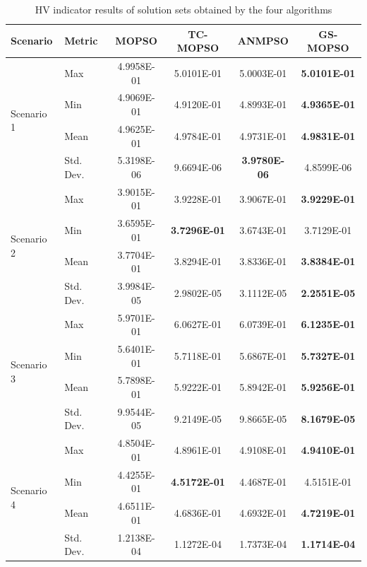 \documentclass[lettersize,journal]{IEEEtran}
\begin{document}
\begin{table}[htbp]
  \centering
  \caption{HV indicator results of solution sets obtained by the four algorithms}
  \label{tab:HV_index_results}
  \small 
  \begin{tabular}{llcccc}
    \toprule
    \textbf{Scenario} & \textbf{Metric} & \textbf{MOPSO} & \textbf{TC-MOPSO} & \textbf{ANMPSO} & \textbf{GS-MOPSO} \\
    \midrule
    \multirow{4}{*}{Scenario 1} 
    & Max & 4.9958E-01 & 5.0101E-01 & 5.0003E-01 & \textbf{5.0101E-01} \\
    & Min & 4.9069E-01 & 4.9120E-01 & 4.8993E-01 & \textbf{4.9365E-01} \\
    & Mean & 4.9625E-01 & 4.9784E-01 & 4.9731E-01 & \textbf{4.9831E-01} \\
    & Std. Dev. & 5.3198E-06 & 9.6694E-06 & \textbf{3.9780E-06} & 4.8599E-06 \\
    \midrule
    \multirow{4}{*}{Scenario 2} 
    & Max & 3.9015E-01 & 3.9228E-01 & 3.9067E-01 & \textbf{3.9229E-01} \\
    & Min & 3.6595E-01 & \textbf{3.7296E-01} & 3.6743E-01 & 3.7129E-01 \\
    & Mean & 3.7704E-01 & 3.8294E-01 & 3.8336E-01 & \textbf{3.8384E-01} \\
    & Std. Dev. & 3.9984E-05 & 2.9802E-05 & 3.1112E-05 & \textbf{2.2551E-05} \\
    \midrule
    \multirow{4}{*}{Scenario 3} 
    & Max & 5.9701E-01 & 6.0627E-01 & 6.0739E-01 & \textbf{6.1235E-01} \\
    & Min & 5.6401E-01 & 5.7118E-01 & 5.6867E-01 & \textbf{5.7327E-01} \\
    & Mean & 5.7898E-01 & 5.9222E-01 & 5.8942E-01 & \textbf{5.9256E-01} \\
    & Std. Dev. & 9.9544E-05 & 9.2149E-05 & 9.8665E-05 & \textbf{8.1679E-05} \\
    \midrule
    \multirow{4}{*}{Scenario 4} 
    & Max & 4.8504E-01 & 4.8961E-01 & 4.9108E-01 & \textbf{4.9410E-01} \\
    & Min & 4.4255E-01 & \textbf{4.5172E-01} & 4.4687E-01 & 4.5151E-01 \\
    & Mean & 4.6511E-01 & 4.6836E-01 & 4.6932E-01 & \textbf{4.7219E-01} \\
    & Std. Dev. & 1.2138E-04 & 1.1272E-04 & 1.7373E-04 & \textbf{1.1714E-04} \\
    \bottomrule
  \end{tabular}
\end{table}
\end{document}
